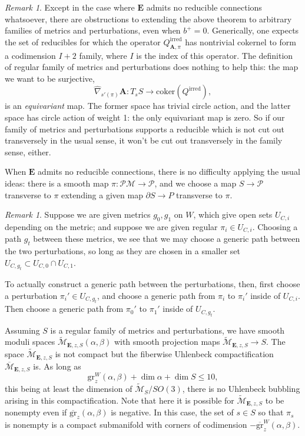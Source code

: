 \documentclass{memo-l}
\theoremstyle{definition}
\theoremstyle{remark}
\newtheorem{remark}[theorem]{Remark}
\numberwithin{section}{chapter}
\numberwithin{equation}{chapter}
\begin{document}
\begin{remark}Except in the case where $\mathbf{E}$ admits no reducible connections whatsoever, there are obstructions to extending the above theorem to arbitrary families of metrics and perturbations, even when $b^+ = 0$. Generically, one expects the set of reducibles for which the operator $Q^{\text{irred}}_{\mathbf{A},\pi}$ has nontrivial cokernel to form a codimension $I+2$ family, where $I$ is the index of this operator. The definition of regular family of metrics and perturbations does nothing to help this: the map we want to be surjective, $$\widehat{\nabla}_{s'(\pi)} \mathbf{A} : T_s S \to \text{coker}(Q^{\text{irred}}),$$ is an \emph{equivariant} map. The former space has trivial circle action, and the latter space has circle action of weight 1: the only equivariant map is zero. So if our family of metrics and perturbations supports a reducible which is not cut out transversely in the usual sense, it won't be cut out transversely in the family sense, either.

When $\mathbf{E}$ admits no reducible connections, there is no difficulty applying the usual ideas: there is a smooth map $\pi: \mathcal P \mathcal M \to \mathcal P$, and we choose a map $S \to \mathcal P$ transverse to $\pi$ extending a given map $\partial S \to P$ transverse to $\pi$.
\end{remark}

\begin{remark}\label{interpolate}Suppose we are given metrics $g_0, g_1$ on $W$, which give open sets $U_{C,i}$ depending on the metric; and suppose we are given regular $\pi_i \in U_{C,i}$. Choosing a path $g_t$ between these metrics, we see that we may choose a generic path between the two perturbations, so long as they are chosen in a smaller set $U_{C,g_t} \subset U_{C,0} \cap U_{C,1}$.

To actually construct a generic path between the perturbations, then, first choose a perturbation $\pi_i' \in U_{C,g_t}$, and choose a generic path from $\pi_i$ to $\pi_i'$ inside of $U_{C,i}$. Then choose a generic path from $\pi_0'$ to $\pi_1'$ inside of $U_{C,g_t}$.
\end{remark}

Assuming $S$ is a regular family of metrics and perturbations, we have smooth moduli spaces $\widetilde{\mathcal M}_{\mathbf{E},z,S}(\alpha, \beta)$ with smooth projection maps $\widetilde{\mathcal M}_{\mathbf{E},z,S} \to S$. The space $\widetilde{\mathcal M}_{\mathbf{E},z,S}$ is not compact but the fiberwise Uhlenbeck compactification $\overline{\mathcal M}_{\mathbf{E},z,S}$ is. As long as
$$\text{gr}^W_z(\alpha, \beta) + \dim \alpha + \dim S \leq 10,$$
this being at least the dimension of $\widetilde{\mathcal M}_S/SO(3)$, there is no Uhlenbeck bubbling arising in this compactification. Note that here it is possible for $\widetilde{\mathcal M}_{\mathbf{E},z,S}$ to be nonempty even if $\overline{\text{gr}}_z(\alpha,\beta)$ is negative. In this case, the set of $s \in S$ so that $\pi_s$ is nonempty is a compact submanifold with corners of codimension $-\overline{\text{gr}}^W_z(\alpha, \beta)$.
\end{document}
